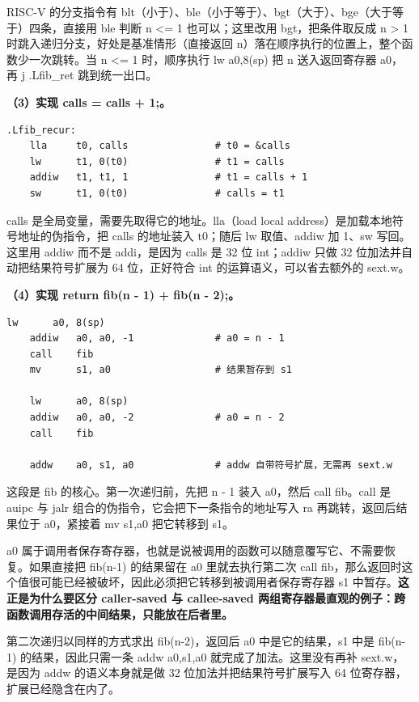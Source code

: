 \documentclass[UTF8,a4paper,10pt]{ctexart}
\begin{document}
RISC-V 的分支指令有 blt（小于）、ble（小于等于）、bgt（大于）、bge（大于等于）四条，直接用 ble 判断 n <= 1 也可以；这里改用 bgt，把条件取反成 n > 1 时跳入递归分支，好处是基准情形（直接返回 n）落在顺序执行的位置上，整个函数少一次跳转。当 n <= 1 时，顺序执行 lw a0,8(sp) 把 n 送入返回寄存器 a0，再 j .Lfib\_ret 跳到统一出口。

\textbf{（3）实现 calls = calls + 1;。}

\begin{lstlisting}[language=riscv]
.Lfib_recur:
    lla     t0, calls               # t0 = &calls
    lw      t1, 0(t0)               # t1 = calls
    addiw   t1, t1, 1               # t1 = calls + 1
    sw      t1, 0(t0)               # calls = t1
\end{lstlisting}

calls 是全局变量，需要先取得它的地址。lla（load local address）是加载本地符号地址的伪指令，把 calls 的地址装入 t0；随后 lw 取值、addiw 加 1、sw 写回。这里用 addiw 而不是 addi，是因为 calls 是 32 位 int；addiw 只做 32 位加法并自动把结果符号扩展为 64 位，正好符合 int 的运算语义，可以省去额外的 sext.w。

\textbf{（4）实现 return fib(n - 1) + fib(n - 2);。}

\begin{lstlisting}[language=riscv]
    lw      a0, 8(sp)
    addiw   a0, a0, -1              # a0 = n - 1
    call    fib
    mv      s1, a0                  # 结果暂存到 s1

    lw      a0, 8(sp)
    addiw   a0, a0, -2              # a0 = n - 2
    call    fib

    addw    a0, s1, a0              # addw 自带符号扩展，无需再 sext.w
\end{lstlisting}

这段是 fib 的核心。第一次递归前，先把 n - 1 装入 a0，然后 call fib。call 是 auipc 与 jalr 组合的伪指令，它会把下一条指令的地址写入 ra 再跳转，返回后结果位于 a0，紧接着 mv s1,a0 把它转移到 s1。

a0 属于调用者保存寄存器，也就是说被调用的函数可以随意覆写它、不需要恢复。如果直接把 fib(n-1) 的结果留在 a0 里就去执行第二次 call fib，那么返回时这个值很可能已经被破坏，因此必须把它转移到被调用者保存寄存器 s1 中暂存。\textbf{这正是为什么要区分 caller-saved 与 callee-saved 两组寄存器最直观的例子：跨函数调用存活的中间结果，只能放在后者里。}

第二次递归以同样的方式求出 fib(n-2)，返回后 a0 中是它的结果，s1 中是 fib(n-1) 的结果，因此只需一条 addw a0,s1,a0 就完成了加法。这里没有再补 sext.w，是因为 addw 的语义本身就是做 32 位加法并把结果符号扩展写入 64 位寄存器，扩展已经隐含在内了。
\end{document}

